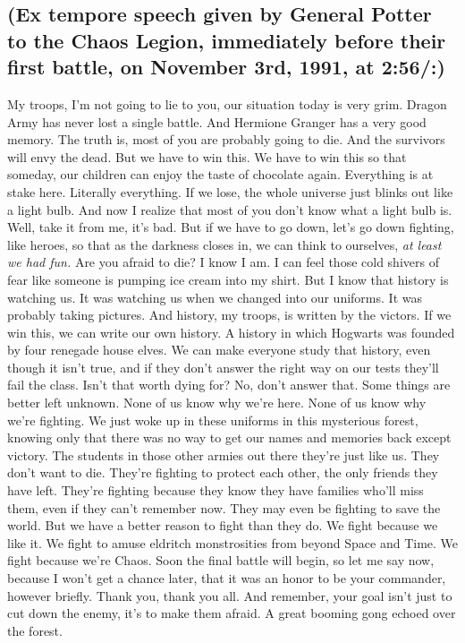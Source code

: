 \subsection{(Ex tempore speech given by General Potter to the Chaos Legion,
immediately before their first battle, on November 3rd, 1991, at 2:56\PM/:)}

My troops, I'm not going to lie to you, our situation today is very grim.
Dragon Army has never lost a single battle. And Hermione Granger{\el} has a
very good memory. The truth is, most of you are probably going to die. And the
survivors will envy the dead. But we have to win this. We have to win this so
that someday, our children can enjoy the taste of chocolate again. Everything
is at stake here. Literally everything. If we lose, the whole universe just
blinks out like a light bulb. And now I realize that most of you don't know
what a light bulb is. Well, take it from me, it's bad. But if we have to go
down, let's go down fighting, like heroes, so that as the darkness closes in,
we can think to ourselves, \emph{at least we had fun.} Are you afraid to die? I
know I am. I can feel those cold shivers of fear like someone is pumping ice
cream into my shirt. But I know{\el} that history is watching us. It was
watching us when we changed into our uniforms. It was probably taking pictures.
And history, my troops, is written by the victors. If we win this, we can write
our own history. A history in which Hogwarts was founded by four renegade house
elves. We can make everyone study that history, even though it isn't true, and
if they don't answer the right way on our tests{\el} they'll fail the class.
Isn't that worth dying for? No, don't answer that. Some things are better left
unknown. None of us know why we're here. None of us know why we're fighting. We
just woke up in these uniforms in this mysterious forest, knowing only that
there was no way to get our names and memories back except victory. The
students in those other armies out there{\el} they're just like us. They
don't want to die. They're fighting to protect each other, the only friends
they have left. They're fighting because they know they have families who'll
miss them, even if they can't remember now. They may even be fighting to save
the world. But we have a better reason to fight than they do. We fight because
we like it. We fight to amuse eldritch monstrosities from beyond Space and
Time. We fight because we're Chaos. Soon the final battle will begin, so let me
say now, because I won't get a chance later, that it was an honor to be your
commander, however briefly. Thank you, thank you all. And remember, your goal
isn't just to cut down the enemy, it's to make them afraid.
\sbreak
A great booming gong echoed over the forest.

